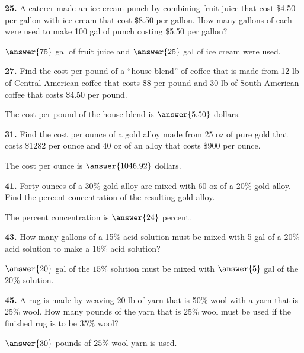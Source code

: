 \documentclass{ximera}
\begin{document}
\begin{problem}
\textbf{25.} A caterer made an ice cream punch by combining fruit juice that cost \$4.50 per
  gallon with ice cream that cost \$8.50 per gallon. How many gallons of each were used
  to make 100 gal of punch costing \$5.50 per gallon?

\( \answer{75} \)  gal of fruit juice and \( \answer{25} \) gal of ice cream were used.
\end{problem}

\begin{problem}
\textbf{27.} Find the cost per pound of a ``house blend'' of coffee that is made from 12 lb of
  Central American coffee that costs \$8 per pound and 30 lb of South American coffee
  that costs \$4.50 per pound.

The cost per pound of the house blend is \(  \answer{5.50} \) dollars.
\end{problem}

\begin{problem}
\textbf{31.} Find the cost per ounce of a gold alloy made from 25 oz of pure gold that costs
  \$1282 per ounce and 40 oz of an alloy that costs \$900 per ounce.

The cost per ounce is \(  \answer{1046.92} \) dollars.
\end{problem}

\begin{problem}
\textbf{41.} Forty ounces of a 30\% gold alloy are mixed with 60 oz of a 20\% gold alloy. Find
  the percent concentration of the resulting gold alloy.

The percent concentration is \( \answer{24} \) percent.
\end{problem}

\begin{problem}
\textbf{43.} How many gallons of a 15\% acid solution must be mixed with 5 gal of a 20\% acid
  solution to make a 16\% acid solution?

\( \answer{20} \) gal of the \( 15 \% \) solution must be mixed with \( \answer{5} \) gal of the \( 20 \% \) solution.
\end{problem}

\begin{problem}
\textbf{45.} A rug is made by weaving 20 lb of yarn that is 50\% wool with a yarn that is 25\%
  wool. How many pounds of the yarn that is 25\% wool must be used if the finished rug is
  to be 35\% wool?

\( \answer{30} \) pounds of \( 25 \% \) wool yarn is used.
\end{problem}
\end{document}
